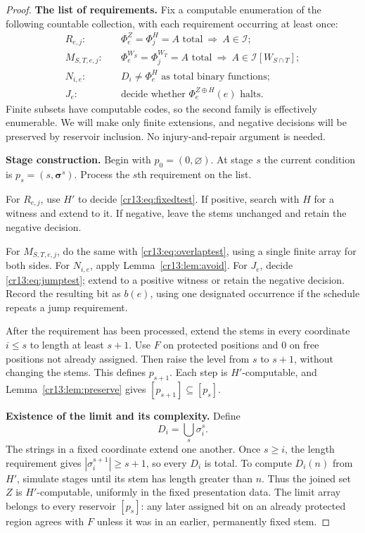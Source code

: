 \documentclass[11pt,letterpaper]{article}
\theoremstyle{definition}
\theoremstyle{remark}\newtheorem{remark}[theorem]{Remark}
\numberwithin{equation}{section}
\newcommand{\Ideal}{\mathcal I}
\begin{document}
\begin{proof}
\textbf{The list of requirements.} Fix a computable enumeration of the following countable collection, with each requirement occurring at least once:
\begin{align*}
 R_{e,j}:&\quad \Phi_e^Z=\Phi_j^H=A\text{ total}\ \Longrightarrow\ A\in\Ideal;\\
 M_{S,T,e,j}:&\quad \Phi_e^{W_S}=\Phi_j^{W_T}=A\text{ total}\
             \Longrightarrow\ A\in\Ideal[W_{S\cap T}];\\
 N_{i,e}:&\quad D_i\ne\Phi_e^H\text{ as total binary functions};\\
 J_e:&\quad\text{decide whether }\Phi_e^{Z\oplus H}(e)\text{ halts}.
\end{align*}
Finite subsets have computable codes, so the second family is effectively enumerable. We will make only finite extensions, and negative decisions will be preserved by reservoir inclusion. No injury-and-repair argument is needed.

\textbf{Stage construction.} Begin with $p_0=(0,\boldsymbol\varnothing)$. At stage $s$ the current condition is $p_s=(s,\boldsymbol\sigma^s)$. Process the $s$th requirement on the list.

For $R_{e,j}$, use $H'$ to decide \eqref{cr13:eq:fixedtest}. If positive, search with $H$ for a witness and extend to it. If negative, leave the stems unchanged and retain the negative decision.

For $M_{S,T,e,j}$, do the same with \eqref{cr13:eq:overlaptest}, using a single finite array for both sides. For $N_{i,e}$, apply Lemma~\ref{cr13:lem:avoid}. For $J_e$, decide \eqref{cr13:eq:jumptest}; extend to a positive witness or retain the negative decision. Record the resulting bit as $b(e)$, using one designated occurrence if the schedule repeats a jump requirement.

After the requirement has been processed, extend the stems in every coordinate $i\le s$ to length at least $s+1$. Use $F$ on protected positions and $0$ on free positions not already assigned. Then raise the level from $s$ to $s+1$, without changing the stems. This defines $p_{s+1}$. Each step is $H'$-computable, and Lemma~\ref{cr13:lem:preserve} gives $[p_{s+1}]\subseteq[p_s]$.

\textbf{Existence of the limit and its complexity.} Define
\[
                        D_i=\bigcup_s\sigma_i^s.
\]
The strings in a fixed coordinate extend one another. Once $s\ge i$, the length requirement gives $|\sigma_i^{s+1}|\ge s+1$, so every $D_i$ is total. To compute $D_i(n)$ from $H'$, simulate stages until its stem has length greater than $n$. Thus the joined set $Z$ is $H'$-computable, uniformly in the fixed presentation data. The limit array belongs to every reservoir $[p_s]$: any later assigned bit on an already protected region agrees with $F$ unless it was in an earlier, permanently fixed stem.


\end{proof}
\end{document}
